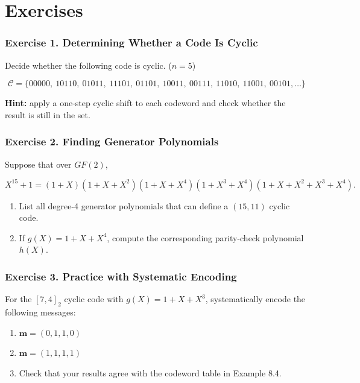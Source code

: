 \documentclass[11pt,oneside]{book}
\theoremstyle{plain}
\theoremstyle{definition}
\theoremstyle{remark}
\begin{document}
\section{Exercises}\label{sec:exercises}

\subsubsection{Exercise 1. Determining Whether a Code Is
Cyclic}\label{exercise-1.-determining-whether-a-code-is-cyclic}

Decide whether the following code is cyclic. (\(n=5\))

\[\mathcal{C} = \{00000,\ 10110,\ 01011,\ 11101,\ 01101,\ 10011,\ 00111,\ 11010,\ 11001,\ 00101, \dots\}\]

\textbf{Hint:} apply a one-step cyclic shift to each codeword and check
whether the result is still in the set.


\subsubsection{Exercise 2. Finding Generator
Polynomials}\label{exercise-2.-finding-generator-polynomials}

Suppose that over \(GF(2)\),

\[X^{15} + 1 = (1+X)(1+X+X^2)(1+X+X^4)(1+X^3+X^4)(1+X+X^2+X^3+X^4).\]

\begin{enumerate}
\def\labelenumi{(\alph{enumi})}
\item
  List all degree-4 generator polynomials that can define a \((15,11)\)
  cyclic code.
\item
  If \(g(X)=1+X+X^4\), compute the corresponding parity-check polynomial
  \(h(X)\).
\end{enumerate}


\subsubsection{Exercise 3. Practice with Systematic
Encoding}\label{exercise-3.-practice-with-systematic-encoding}

For the \([7,4]_2\) cyclic code with \(g(X)=1+X+X^3\), systematically
encode the following messages:

\begin{enumerate}
\def\labelenumi{(\alph{enumi})}
\item
  \(\mathbf{m}=(0,1,1,0)\)
\item
  \(\mathbf{m}=(1,1,1,1)\)
\item
  Check that your results agree with the codeword table in Example 8.4.
\end{enumerate}
\end{document}
